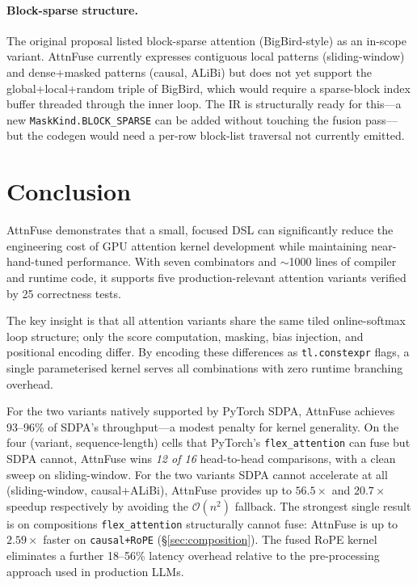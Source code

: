 \documentclass[10pt,twocolumn]{article}
\begin{document}
\paragraph{Block-sparse structure.}
The original proposal listed block-sparse attention (BigBird-style) as
an in-scope variant.  AttnFuse currently expresses contiguous local
patterns (sliding-window) and dense+masked patterns (causal, ALiBi)
but does not yet support the global+local+random triple of BigBird,
which would require a sparse-block index buffer threaded through the
inner loop.  The IR is structurally ready for this---a new
\texttt{MaskKind.BLOCK\_SPARSE} can be added without touching the
fusion pass---but the codegen would need a per-row block-list traversal
not currently emitted.

\section{Conclusion}

AttnFuse demonstrates that a small, focused DSL can significantly reduce
the engineering cost of GPU attention kernel development while maintaining
near-hand-tuned performance.  With seven combinators and $\sim$1000 lines
of compiler and runtime code, it supports five production-relevant attention
variants verified by 25 correctness tests.

The key insight is that all attention variants share the same tiled
online-softmax loop structure; only the score computation, masking, bias
injection, and positional encoding differ.  By encoding these differences as
\texttt{tl.constexpr} flags, a single parameterised kernel serves all
combinations with zero runtime branching overhead.

For the two variants natively supported by PyTorch SDPA, AttnFuse achieves
93--96\% of SDPA's throughput---a modest penalty for kernel generality.
On the four (variant, sequence-length) cells that PyTorch's
\texttt{flex\_attention} can fuse but SDPA cannot, AttnFuse wins
\emph{12 of 16} head-to-head comparisons, with a clean sweep on
sliding-window. For the two variants SDPA cannot accelerate at all
(sliding-window, causal+ALiBi), AttnFuse provides up to
$56.5\times$ and $20.7\times$ speedup respectively by avoiding the
$\mathcal{O}(n^2)$ fallback. The strongest single result is on
compositions \texttt{flex\_attention} structurally cannot fuse: AttnFuse
is up to $2.59\times$ faster on \texttt{causal+RoPE} (\S\ref{sec:composition}).  The fused RoPE kernel eliminates a further 18--56\% latency
overhead relative to the pre-processing approach used in production LLMs.
\end{document}
